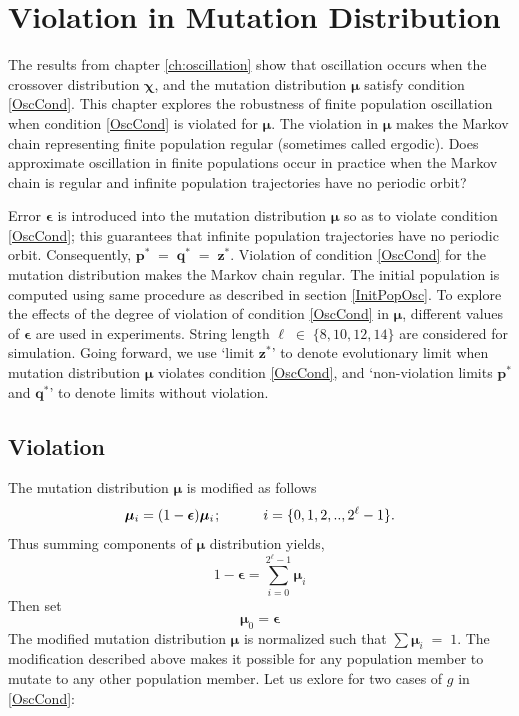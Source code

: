 \chapter{Violation in Mutation Distribution} \label{ch:muviolation}
The results from chapter \ref{ch:oscillation} show that oscillation occurs
when the crossover distribution $\bm{\chi}$, and the mutation distribution $\bm{\mu}$ 
satisfy condition \ref{OscCond}. This chapter explores the robustness of 
finite population oscillation when condition \ref{OscCond} is violated for $\bm{\mu}$. 
The violation in $\bm{\mu}$ makes the Markov chain representing finite population regular 
(sometimes called ergodic).
Does approximate oscillation in finite populations occur in practice when the
Markov chain is regular and infinite population trajectories
have no periodic orbit?

Error $\bm{\epsilon}$ is introduced into the mutation distribution $\bm{\mu}$ so as to 
violate condition \ref{OscCond}; this guarantees that 
infinite population trajectories have no periodic orbit. Consequently, $\bm{p}^\ast \;=\; \bm{q}^\ast \;=\; \bm{z}^\ast$. 
Violation of condition \ref{OscCond} for the mutation distribution makes the Markov chain regular. The initial population is 
computed using same procedure as described in section \ref{InitPopOsc}. To explore the effects of the degree  
of violation of condition \ref{OscCond} in $\bm{\mu}$, different values of $\bm{\epsilon}$ are used in experiments. 
String length $\ell \;\in\; \{8, 10, 12, 14\}$ are considered for simulation.
Going forward, we use `limit $\bm{z}^\ast$' to denote evolutionary limit when mutation distribution $\bm{\mu}$ 
violates condition \ref{OscCond}, and 
`non-violation limits $\bm{p}^\ast$ and $\bm{q}^\ast$' to denote limits without violation.

\section{Violation}
The mutation distribution $\bm{\mu}$ is modified as follows
\[
\bm{\mu}_i = (1-\bm{\epsilon}) \bm{\mu}_i \hspace{0.01in}; \hspace{30pt} i = \{0, 1, 2,.., 2^{\ell}-1\}.
\]
Thus summing components of $\bm{\mu}$ distribution yields, 
\[
1-\bm{\epsilon} = \sum \limits_{i=0}^{2^{\ell}-1} \bm{\mu}_i
\]
Then set
\[
\bm{\mu}_0 = \bm{\epsilon}
\]
The modified mutation distribution $\bm{\mu}$ is normalized such that  $\sum \bm{\mu}_i \;=\; 1$.
The modification described above makes it possible for any population member to mutate to any other population member.
Let us exlore for two cases of $g$ in \ref{OscCond}:


